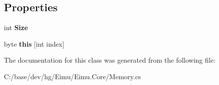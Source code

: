 \subsection*{Properties}
\begin{DoxyCompactItemize}
\item 
\hypertarget{class_eimu_1_1_core_1_1_memory_a3e769833056e8f208d585bf61e38744b}{
int {\bfseries Size}}
\label{class_eimu_1_1_core_1_1_memory_a3e769833056e8f208d585bf61e38744b}

\item 
\hypertarget{class_eimu_1_1_core_1_1_memory_a5e6f8d1809ca8cb69097fe01e6da1752}{
byte {\bfseries this} \mbox{[}int index\mbox{]}}
\label{class_eimu_1_1_core_1_1_memory_a5e6f8d1809ca8cb69097fe01e6da1752}

\end{DoxyCompactItemize}


The documentation for this class was generated from the following file:\begin{DoxyCompactItemize}
\item 
C:/base/dev/hg/Eimu/Eimu.Core/Memory.cs\end{DoxyCompactItemize}
